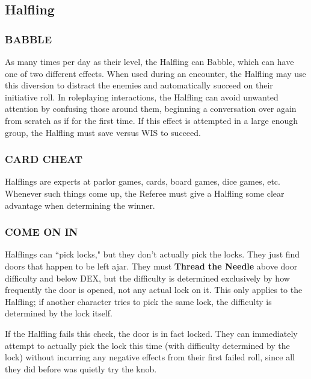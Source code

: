 \documentclass[twoside]{article}
\newcommand{\TTN}[2]{\textbf{Thread the Needle} above #1 and below #2}
\begin{document}
\subsection*{Halfling}

\subsubsection*{\footnotesize{B}\scriptsize{ABBLE}\normalsize}

As many times per day as their level, the Halfling can Babble, which can have one of two different effects. When used during an encounter, the Halfling may use this diversion to distract the enemies and automatically succeed on their initiative roll. In roleplaying interactions, the Halfling can avoid unwanted attention by confusing those around them, beginning a conversation over again from scratch as if for the first time. If this effect is attempted in a large enough group, the Halfling must save versus WIS to succeed.

\subsubsection*{\footnotesize{C}\scriptsize{ARD} \footnotesize{C}\scriptsize{HEAT}\normalsize}

Halflings are experts at parlor games, cards, board games, dice games, etc. Whenever such things come up, the Referee must give a Halfling some clear advantage when determining the winner.

\subsubsection*{\footnotesize{C}\scriptsize{OME ON} \footnotesize{I}\scriptsize{N}\normalsize}

Halflings can ``pick locks," but they don't actually pick the locks. They just find doors that happen to be left ajar. They must \TTN{door difficulty}{DEX}, but the difficulty is determined exclusively by how frequently the door is opened, not any actual lock on it. This only applies to the Halfling; if another character tries to pick the same lock, the difficulty is determined by the lock itself.

\bigbreak

If the Halfling fails this check, the door is in fact locked. They can immediately attempt to actually pick the lock this time (with difficulty determined by the lock) without incurring any negative effects from their first failed roll, since all they did before was quietly try the knob. 
\end{document}
